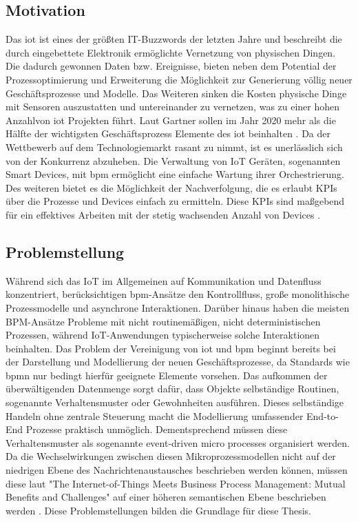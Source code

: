 \documentclass[a4paper, 12pt, twoside, headsepline=true]{scrartcl} %
\begin{document}
\subsection{Motivation} \label{sec:subsection}
Das \ac{iot} ist eines der größten IT-Buzzwords der letzten Jahre und beschreibt die durch eingebettete Elektronik ermöglichte Vernetzung von physischen Dingen. Die dadurch gewonnen Daten bzw. Ereignisse, bieten neben dem Potential der Prozessoptimierung und Erweiterung die Möglichkeit zur Generierung völlig neuer Geschäftsprozesse und Modelle. 
Das Weiteren sinken die Kosten physische Dinge mit Sensoren auszustatten und untereinander zu vernetzen, was zu einer hohen Anzahlvon \ac{iot} Projekten führt. Laut Gartner sollen im Jahr 2020 mehr als die Hälfte der wichtigsten Geschäftsprozess Elemente des \ac{iot} beinhalten \cite{garnteriotgrowth}. Da der Wettbewerb auf dem Technologiemarkt rasant zu nimmt, ist es unerlässlich sich von der Konkurrenz abzuheben. Die Verwaltung von IoT Geräten, sogenannten Smart Devices, mit \ac{bpm} ermöglicht eine einfache Wartung ihrer Orchestrierung. Des weiteren bietet es die Möglichkeit der Nachverfolgung, die es erlaubt KPIs über die Prozesse und Devices einfach zu ermitteln. Diese KPIs sind maßgebend für ein effektives Arbeiten mit der stetig wachsenden Anzahl von Devices \cite{bpmofthings}.

\subsection{Problemstellung} 
Während sich das IoT im Allgemeinen auf Kommunikation und Datenfluss konzentriert, berücksichtigen \ac{bpm}-Ansätze den Kontrollfluss, große monolithische Prozessmodelle und asynchrone Interaktionen. Darüber hinaus haben die meisten BPM-Ansätze Probleme mit nicht routinemäßigen, nicht deterministischen Prozessen, während IoT-Anwendungen typischerweise solche Interaktionen beinhalten. Das Problem der Vereinigung von \ac{iot} und \ac{bpm} beginnt bereits bei der Darstellung und Modellierung der neuen Geschäftsprozesse, da Standards wie \ac{bpmn} nur bedingt hierfür geeignete Elemente vorsehen. Das aufkommen der überwältigenden Datenmenge sorgt dafür, dass Objekte selbständige Routinen, sogenannte Verhaltensmuster oder Gewohnheiten ausführen. Dieses selbständige Handeln ohne zentrale Steuerung macht die Modellierung umfassender End-to-End Prozesse praktisch unmöglich. Dementsprechend müssen diese Verhaltensmuster als sogenannte event-driven micro processes organisiert werden. Da die Wechselwirkungen zwischen diesen Mikroprozessmodellen nicht auf der niedrigen Ebene des Nachrichtenaustausches beschrieben werden können, müssen diese laut "The Internet-of-Things Meets Business Process Management: Mutual Benefits and Challenges" auf einer höheren semantischen Ebene beschrieben werden \cite{iotmeetsbpm}. Diese Problemstellungen bilden die Grundlage für diese Thesis.
\end{document}

